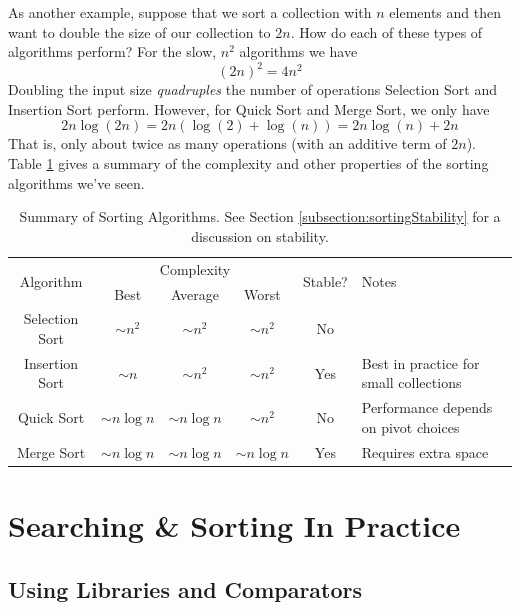 As another example, suppose that we sort a collection with $n$ elements
and then want to double the size of our collection to $2n$.  How do each
of these types of algorithms perform?  For the slow, $n^2$ algorithms we
have 
  $$(2n)^2 = 4n^2$$
Doubling the input size \emph{quadruples} the number of operations
Selection Sort and Insertion Sort perform.  However, for Quick Sort and
Merge Sort, we only have
  $$2n \log{(2n)} = 2n\left( \log{(2)} + \log{(n)}\right) = 2n\log{(n)} + 2n$$
That is, only about twice as many operations (with an additive term of $2n$). Table \ref{table:sortingSummary} gives a summary of the complexity and other
properties of the sorting algorithms we've seen.

\begin{table}[h]
\centering
\begin{tabular}{|c|c|c|c|c|p{4cm}|}
\hline
\multirow{2}{*}{Algorithm} & \multicolumn{3}{|c|}{Complexity} & \multirow{2}{*}{Stable?} & \multirow{2}{*}{Notes} \\ \cline{2-4}
~ & Best & Average & Worst & ~ & ~ \\
\hline
Selection Sort & $\sim n^2$ & $\sim n^2$ & $\sim n^2$ & No & \\
\hline
Insertion Sort & $\sim n$ & $\sim n^2$ & $\sim n^2$ & Yes & Best in practice for small collections\\
\hline
Quick Sort & $\sim n\log{n}$ & $\sim n\log{n}$ & $\sim n^2$ & No & Performance depends on pivot choices\\
\hline
Merge Sort & $\sim n\log{n}$ & $\sim n\log{n}$ & $\sim n\log{n}$ & Yes & Requires extra space \\
\hline
\end{tabular}
\caption{Summary of Sorting Algorithms.  See Section
\ref{subsection:sortingStability} for a discussion on stability.}
\label{table:sortingSummary}
\end{table}

\section{Searching \& Sorting In Practice}

\subsection{Using Libraries and Comparators}


